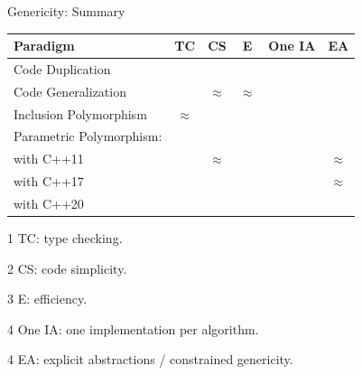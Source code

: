 \documentclass[12pt,aspectratio=169]{beamer}
\newcommand{\cmark}{\textcolor{green!50!white}{\ding{51}}}%
\newcommand{\xmark}{\textcolor{red!50!white}{\ding{55}}}%
\newcommand{\eqmark}{{\bf \(\approx\)}}
\begin{document}
\begin{frame}[fragile]{Genericity: Summary}
  \begin{table}[htbp]
    \centering
    \small
    \begin{threeparttable}
      \begin{tabular}[width=0.8\linewidth]{l|ccccc}
        Paradigm                 & TC\tnote{1} & CS\tnote{2} & E\tnote{3} & One IA\tnote{4} & EA\tnote{5} \\
        \hline
        Code Duplication         & \cmark      & \xmark      & \cmark     & \xmark          & \xmark      \\
        Code Generalization      & \xmark      & \eqmark     & \eqmark    & \cmark          & \xmark      \\
        Inclusion Polymorphism   & \eqmark     & \cmark      & \xmark     & \cmark          & \cmark      \\
        Parametric Polymorphism: &             &             &            &                 &             \\
        \quad with C++11         & \cmark      & \eqmark     & \cmark     & \cmark          & \eqmark     \\
        \quad with C++17         & \cmark      & \cmark      & \cmark     & \cmark          & \eqmark     \\
        \quad with C++20         & \cmark      & \cmark      & \cmark     & \cmark          & \cmark      \\
      \end{tabular}
      \begin{tablenotes}
        \item[1] TC: type checking.
        \item[2] CS: code simplicity.
        \item[3] E: efficiency.
        \item[4] One IA: one implementation per algorithm.
        \item[4] EA: explicit abstractions / constrained genericity.
      \end{tablenotes}
      \label{table:gen.approaches}
    \end{threeparttable}
  \end{table}
\end{frame}
\end{document}
